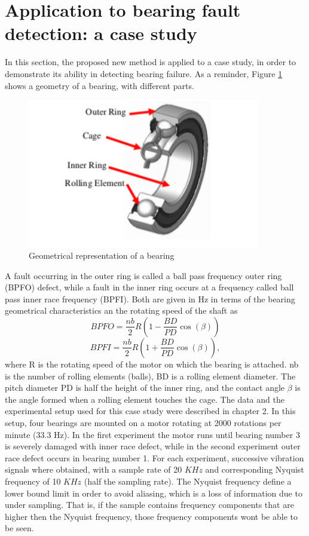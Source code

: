 \documentclass[../Main/thesis.tex]{subfiles}
\begin{document}
\section{Application to bearing fault detection: a case study}
\label{sec:pulse}
In this section, the proposed new method is applied to a case study, in order to demonstrate its ability in detecting bearing failure. As a reminder, Figure \ref{fig:bearing-architecture} shows a geometry of a bearing, with different parts.
\begin{figure}[H] %
   \centering
   \includegraphics[width=4in]{../fig/bearing.png} 
   \caption{Geometrical representation of a bearing}
   \label{fig:bearing-architecture}
\end{figure}
\justify
A fault occurring in the outer ring is called a ball pass frequency outer ring (BPFO) defect, while a fault in the inner ring occurs at a frequency called ball pass inner race frequency (BPFI). Both are given in Hz in terms of the bearing geometrical characteristics an the rotating speed of the shaft as
\begin{equation}\label{eq:bpfo2}
BPFO = \frac{nb}{2}R\left(1-\frac{BD}{PD}\cos\left(\beta\right)  \right) \nonumber
\end{equation}
\begin{equation}\label{eq:bpfi2}
BPFI = \frac{nb}{2}R\left( 1 +  \frac{BD}{PD}\cos\left(\beta\right)   \right),
\end{equation}
where R is the rotating speed of the motor on which the bearing is attached. nb is the number of rolling elements (balls), BD is a rolling element diameter. The pitch diameter PD is half the height of the inner ring, and the contact angle $\beta$ is the angle formed when a rolling element touches the cage. 
\justify
The data and the experimental setup used for this case study were described in chapter 2. In this setup, four bearings are mounted on a motor rotating at 2000 rotations per minute (33.3 Hz). In the first experiment the motor runs until
bearing number 3 is severely damaged with inner race defect, while in the second experiment outer race defect occurs in bearing number 1. For each experiment, successive vibration signals where obtained, with a sample rate of 20 $KHz$ and corresponding Nyquist frequency of 10 $KHz$ (half the sampling rate). The Nyquist frequency define a lower bound limit in order to avoid aliasing, which is a loss of information due to under sampling. That is, if the sample contains frequency components that are higher then the Nyquist frequency, those frequency components wont be able to be seen.
\end{document}

